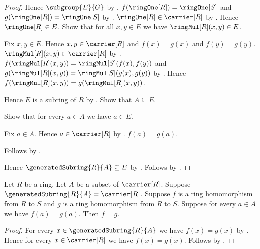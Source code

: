 \begin{proof}
    Hence $\subgroup{E}{G}$ by .
    $f(\ringOne[R])=\ringOne[S]$ and
        $g(\ringOne[R])=\ringOne[S]$ by .
    $\ringOne[R]\in\carrier[R]$ by .
    Hence $\ringOne[R]\in E$.
    Show that for all $x,y\in E$ we have $\ringMul[R](x,y)\in E$.
    \begin{subproof}
        Fix $x,y\in E$.
        Hence $x,y\in\carrier[R]$ and
            $f(x)=g(x)$ and $f(y)=g(y)$.
        $\ringMul[R](x,y)\in\carrier[R]$ by
            .
        $f(\ringMul[R](x,y))=\ringMul[S](f(x),f(y))$ and
            $g(\ringMul[R](x,y))=\ringMul[S](g(x),g(y))$ by
            .
        Hence $f(\ringMul[R](x,y))=g(\ringMul[R](x,y))$.
    \end{subproof}
    Hence $E$ is a subring of $R$ by .
    Show that $A\subseteq E$.
    \begin{subproof}
        Show that for every $a\in A$ we have $a\in E$.
        \begin{subproof}
            Fix $a\in A$.
            Hence $a\in\carrier[R]$ by .
            $f(a)=g(a)$.
        \end{subproof}
        Follows by .
    \end{subproof}
    Hence $\generatedSubring{R}{A}\subseteq E$ by
        .
    Follows by .
\end{proof}

\begin{theorem}\label{ring_hom_equality_from_generated_subring}
    Let $R$ be a ring.
    Let $A$ be a subset of $\carrier[R]$.
    Suppose $\generatedSubring{R}{A}=\carrier[R]$.
    Suppose $f$ is a ring homomorphism from $R$ to $S$ and
        $g$ is a ring homomorphism from $R$ to $S$.
    Suppose for every $a\in A$ we have $f(a)=g(a)$.
    Then $f=g$.
\end{theorem}
\begin{proof}
    For every $x\in\generatedSubring{R}{A}$ we have $f(x)=g(x)$ by
        .
    Hence for every $x\in\carrier[R]$ we have $f(x)=g(x)$.
    Follows by .
\end{proof}
